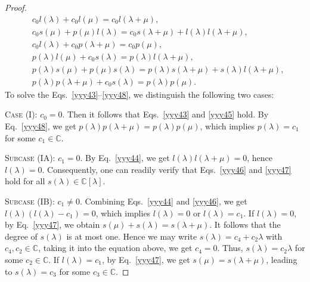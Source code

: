 \documentclass[11pt,letterpaper,reqno]{amsart}
\theoremstyle{definition}
\numberwithin{equation}{section}
\begin{document}
\begin{proof}
\begin{align}
&c_{0}l(\lambda)+c_{0}l(\mu)=c_{0}l(\lambda+\mu),\label{yyy43}\\
&c_{0}s(\mu)+p(\mu)l(\lambda)=c_{0}s(\lambda+\mu)+l(\lambda)l(\lambda+\mu),\label{yyy44}\\
&c_{0}l(\lambda)+c_{0}p(\lambda+\mu)=c_{0}p(\mu),\label{yyy45}\\
&p(\lambda)l(\mu)+c_{0}s(\lambda)=p(\lambda)l(\lambda+\mu),\label{yyy46}\\
&p(\lambda)s(\mu)+p(\mu)s(\lambda)=p(\lambda)s(\lambda+\mu)+s(\lambda)l(\lambda+\mu),\label{yyy47}\\
&p(\lambda)p(\lambda+\mu)+c_{0}s(\lambda)=p(\lambda)p(\mu)\label{yyy48}.
\end{align}
To solve the Eqs.~\eqref{yyy43}--\eqref{yyy48}, we distinguish the following two cases:

C\textsc{ase} (I): $c_{0}=0$. Then it follows that Eqs.~\eqref{yyy43} and \eqref{yyy45} hold. By Eq.~\eqref{yyy48}, we get
$p(\lambda)p(\lambda+\mu)=p(\lambda)p(\mu)$, which implies $p(\lambda)=c_1$ for some $c_1\in \mathbb{C}$.

S\textsc{ubcase} (IA): $c_{1}=0$. By Eq.~\eqref{yyy44}, we get $l(\lambda)l(\lambda+\mu)=0$, hence $l(\lambda)=0$.
Consequently, one can readily verify that Eqs.~\eqref{yyy46} and \eqref{yyy47} hold for all $s(\lambda)\in \mathbb{C}[\lambda]$.

S\textsc{ubcase} (IB): $c_{1}\neq0$. Combining Eqs.~\eqref{yyy44} and \eqref{yyy46}, we get $l(\lambda)(l(\lambda)-c_1)=0$, which implies
$l(\lambda)=0$ or $l(\lambda)=c_1$. If $l(\lambda)=0$, by Eq.~\eqref{yyy47}, we obtain $s(\mu)+s(\lambda)=s(\lambda+\mu)$.
It follows that the degree of $s(\lambda)$ is at most one. Hence we may write $s(\lambda)=c_4+c_2\lambda$ with $c_4,c_2\in \mathbb{C}$,
taking it into the equation above, we get $c_4=0$. Thus, $s(\lambda)=c_2\lambda$ for some $c_2\in \mathbb{C}$.
If $l(\lambda)=c_1$, by Eq.~\eqref{yyy47}, we get $s(\mu)=s(\lambda+\mu)$, leading to $s(\lambda)=c_3$ for some $c_3\in \mathbb{C}$.


\end{proof}
\end{document}
